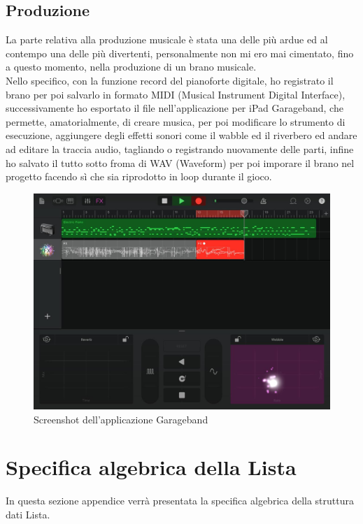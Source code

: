 \documentclass[italian,12pt,a4paper]{article}
\begin{document}
	\subsection{Produzione}
	La parte relativa alla produzione musicale è stata una delle più ardue ed al contempo una delle più divertenti, personalmente non mi ero mai cimentato, fino a questo momento, nella produzione di un brano musicale.\\
	\linebreak
	Nello specifico, con la funzione record del pianoforte digitale, ho registrato il brano per poi salvarlo in formato MIDI (Musical Instrument Digital Interface), successivamente ho esportato il file nell'applicazione per iPad Garageband, che permette, amatorialmente, di creare musica, per poi modificare lo strumento di esecuzione, aggiungere degli effetti sonori come il wabble ed il riverbero ed andare ad editare la traccia audio, tagliando o registrando nuovamente delle parti, infine ho salvato il tutto sotto froma di WAV (Waveform) per poi imporare il brano nel progetto facendo sì che sia riprodotto in loop durante il gioco. 
	\linebreak
	\begin{figure}[!h]
		\centering
		\includegraphics[width=14cm]{garageband.jpg}
		\caption{Screenshot dell'applicazione Garageband}
		\label{fig:musica}
	\end{figure}
	
	\section{Specifica algebrica della Lista}
	In questa sezione appendice verrà presentata la specifica algebrica della struttura dati Lista.
\end{document}
